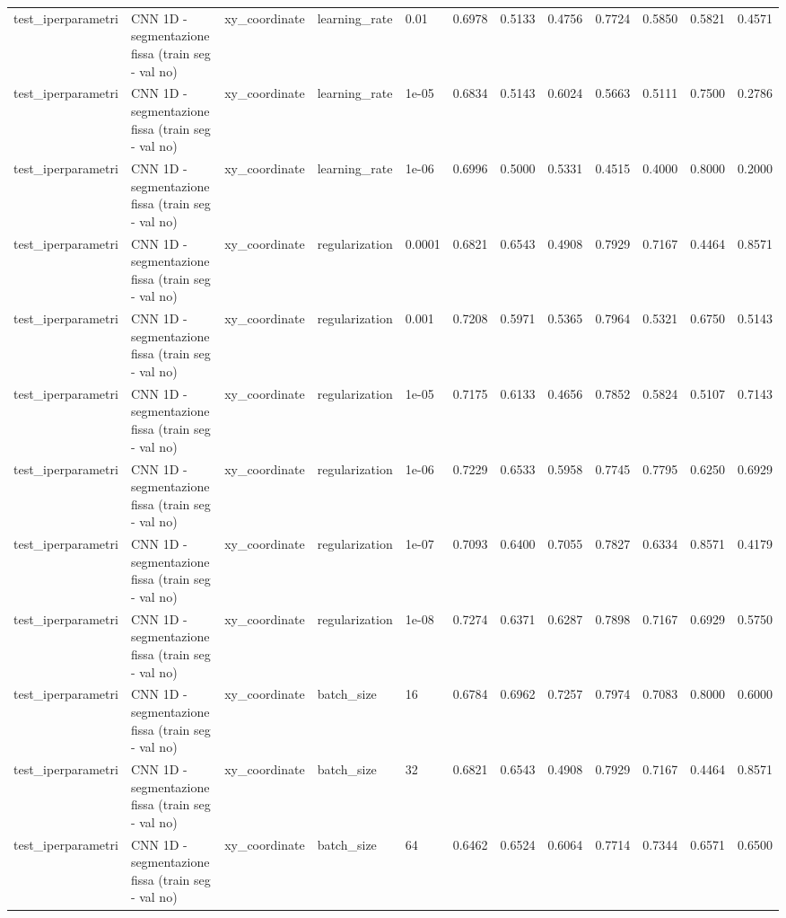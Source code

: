 \documentclass{article}
\begin{document}
\begin{table}[htbp]
\begin{adjustbox}{max width=\textwidth}
\begin{tabular}{lllllrrrrrrr}
test\_iperparametri & CNN 1D - segmentazione fissa (train seg - val no) & xy\_coordinate & learning\_rate & 0.01 & 0.6978 & 0.5133 & 0.4756 & 0.7724 & 0.5850 & 0.5821 & 0.4571 \\
test\_iperparametri & CNN 1D - segmentazione fissa (train seg - val no) & xy\_coordinate & learning\_rate & 1e-05 & 0.6834 & 0.5143 & 0.6024 & 0.5663 & 0.5111 & 0.7500 & 0.2786 \\
test\_iperparametri & CNN 1D - segmentazione fissa (train seg - val no) & xy\_coordinate & learning\_rate & 1e-06 & 0.6996 & 0.5000 & 0.5331 & 0.4515 & 0.4000 & 0.8000 & 0.2000 \\
test\_iperparametri & CNN 1D - segmentazione fissa (train seg - val no) & xy\_coordinate & regularization & 0.0001 & 0.6821 & 0.6543 & 0.4908 & 0.7929 & 0.7167 & 0.4464 & 0.8571 \\
test\_iperparametri & CNN 1D - segmentazione fissa (train seg - val no) & xy\_coordinate & regularization & 0.001 & 0.7208 & 0.5971 & 0.5365 & 0.7964 & 0.5321 & 0.6750 & 0.5143 \\
test\_iperparametri & CNN 1D - segmentazione fissa (train seg - val no) & xy\_coordinate & regularization & 1e-05 & 0.7175 & 0.6133 & 0.4656 & 0.7852 & 0.5824 & 0.5107 & 0.7143 \\
test\_iperparametri & CNN 1D - segmentazione fissa (train seg - val no) & xy\_coordinate & regularization & 1e-06 & 0.7229 & 0.6533 & 0.5958 & 0.7745 & 0.7795 & 0.6250 & 0.6929 \\
test\_iperparametri & CNN 1D - segmentazione fissa (train seg - val no) & xy\_coordinate & regularization & 1e-07 & 0.7093 & 0.6400 & 0.7055 & 0.7827 & 0.6334 & 0.8571 & 0.4179 \\
test\_iperparametri & CNN 1D - segmentazione fissa (train seg - val no) & xy\_coordinate & regularization & 1e-08 & 0.7274 & 0.6371 & 0.6287 & 0.7898 & 0.7167 & 0.6929 & 0.5750 \\
test\_iperparametri & CNN 1D - segmentazione fissa (train seg - val no) & xy\_coordinate & batch\_size & 16 & 0.6784 & 0.6962 & 0.7257 & 0.7974 & 0.7083 & 0.8000 & 0.6000 \\
test\_iperparametri & CNN 1D - segmentazione fissa (train seg - val no) & xy\_coordinate & batch\_size & 32 & 0.6821 & 0.6543 & 0.4908 & 0.7929 & 0.7167 & 0.4464 & 0.8571 \\
test\_iperparametri & CNN 1D - segmentazione fissa (train seg - val no) & xy\_coordinate & batch\_size & 64 & 0.6462 & 0.6524 & 0.6064 & 0.7714 & 0.7344 & 0.6571 & 0.6500 \\

\end{tabular}
\end{adjustbox}
\end{table}
\end{document}
